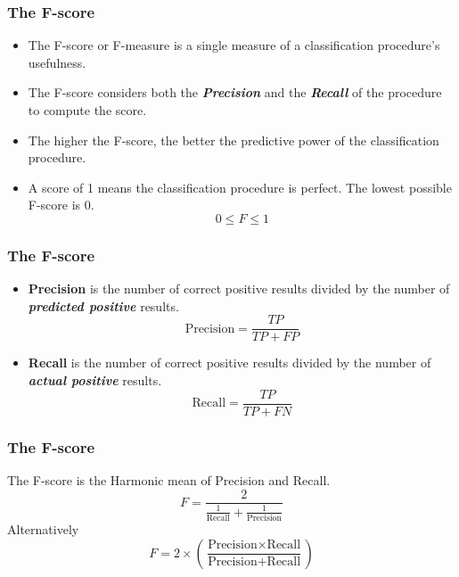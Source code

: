 \documentclass{beamer}
\begin{document}
\begin{frame}
\frametitle{The F-score}
\Large
\begin{itemize}
\item The F-score or F-measure is a single measure of a classification procedure's usefulness. 
\item The F-score considers both the \textit{\textbf{Precision}} and the \textit{\textbf{Recall}} of the procedure to compute the score.
\item The higher the F-score, the better the predictive power of the 
classification procedure. 
\item A score of 1 means the classification procedure is perfect. The lowest possible F-score is 0.
\[ 0 \leq F \leq 1 \]
\end{itemize}
\end{frame}
\begin{frame}
\frametitle{The F-score}
\Large
\begin{itemize}
\item \textbf{Precision} is the number of correct positive results divided by the number of \textit{\textbf{predicted positive}} results.
\[ \mbox{Precision}= \frac{TP}{TP+FP}  \]
\item \textbf{Recall} is the number of correct positive results divided by the number of \textit{\textbf{actual positive}} results. 
\[ \mbox{Recall}= \frac{TP}{TP+FN}  \]
\end{itemize}
\end{frame}
\begin{frame}
\frametitle{The F-score}
\Large The F-score is the Harmonic mean of Precision and Recall.
\[ F = \frac{2}{\frac{1}{\mbox{Recall}} + \frac{1}{\mbox{Precision}}} \]
Alternatively
\[ F = 2 \times \left( \frac{\mbox{Precision} \times \mbox{Recall}}{\mbox{Precision} + \mbox{Recall}} \right) \] 
\end{frame}
\end{document}
